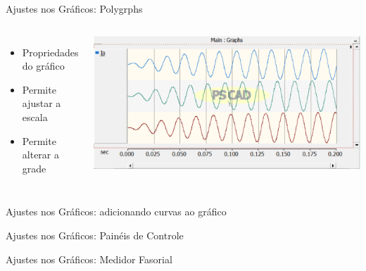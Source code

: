 \begin{frame}{Ajustes nos Gráficos: Polygrphs}
\centering

\begin{columns}

\begin{itemize}
\item Propriedades do gráfico
\vspace*{1cm}
\item Permite ajustar a escala
\vspace*{1cm}
\item Permite alterar a grade
\end{itemize}


\centering
\includegraphics[width=0.9\linewidth]{./figuras/Visualizacao-resultados/graficos-polygraph}

\end{columns}

\end{frame}





\begin{frame}{Ajustes nos Gráficos: adicionando curvas ao gráfico}
\centering


\end{frame}






\begin{frame}{Ajustes nos Gráficos: Painéis de Controle}
\centering


\end{frame}







\begin{frame}{Ajustes nos Gráficos: Medidor Fasorial}
\centering


\end{frame}



